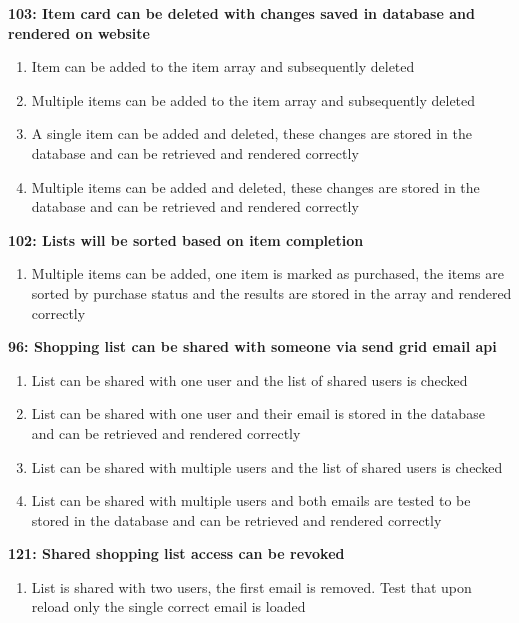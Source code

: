 \documentclass[10pt,onecolumn]{witseiepaper}
\begin{document}
\textbf{103: Item card can be deleted with changes saved in database and rendered on website}
\begin{enumerate}
	\item Item can be added to the item array and subsequently deleted
	\item Multiple items can be added to the item array and subsequently deleted
	\item A single item can be added and deleted, these changes are stored in the database and can be retrieved and rendered correctly
	\item Multiple items can be added and deleted, these changes are stored in the database and can be retrieved and rendered correctly
\end{enumerate}

\textbf{102: Lists will be sorted based on item completion}

\begin{enumerate}
	\item Multiple items can be added, one item is marked as purchased, the items are sorted by purchase status and the results are stored in the array and rendered correctly
\end{enumerate}

\textbf{96: Shopping list can be shared with someone via send grid email api}
\begin{enumerate}
	\item List can be shared with one user and the list of shared users is checked
	\item List can be shared with one user and their email is stored in the database and can be retrieved and rendered correctly
	\item List can be shared with multiple users and the list of shared users is checked
	\item List can be shared with multiple users and both emails are tested to be stored in the database and can be retrieved and rendered correctly
\end{enumerate}

\textbf{121: Shared shopping list access can be revoked}

\begin{enumerate}
	\item List is shared with two users, the first email is removed. Test that upon reload only the single correct email is loaded
\end{enumerate}

%
\end{document}
